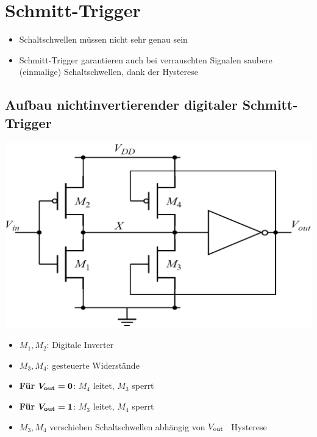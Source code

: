 \section{Schmitt-Trigger}

\begin{itemize}
    \item Schaltschwellen müssen nicht sehr genau sein
    \item Schmitt-Trigger garantieren auch bei verrauschten Signalen saubere (einmalige) Schaltschwellen, dank der Hysterese
\end{itemize}



\subsection{Aufbau nichtinvertierender digitaler Schmitt-Trigger}

\begin{minipage}[position]{0.35\columnwidth}
    \includegraphics[width=\columnwidth]{images/nichtinvertierender_schmitt-trigger.png}
\end{minipage}
\hfill
\begin{minipage}[position]{0.63\columnwidth}
    \begin{itemize}
        \item $M_1, M_2$: Digitale Inverter
        \item $M_3, M_4$: gesteuerte Widerstände
        \item \textbf{Für }$\boldsymbol{V_{\rm out} = 0}$: $M_4$ leitet, $M_3$ sperrt
        \item \textbf{Für }$\boldsymbol{V_{\rm out} = 1}$: $M_3$ leitet, $M_4$ sperrt
        \item $M_3, M_4$ verschieben Schaltschwellen abhängig von $V_{\rm out}$ \textrightarrow\ Hysterese
    \end{itemize}
\end{minipage}


